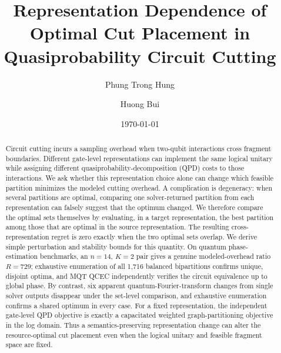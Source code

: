 \documentclass[
  aps,
  pra,
  reprint,
  amsmath,
  amssymb,
  longbibliography,
  nofootinbib,
  floatfix
]{revtex4-2}
\theoremstyle{plain}
\begin{document}
\title{Representation Dependence of Optimal Cut Placement in Quasiprobability Circuit Cutting}

\author{Phung Trong Hung}

\author{Huong Bui}

\date{\today}


\begin{abstract}
Circuit cutting incurs a sampling overhead when two-qubit interactions cross fragment boundaries. Different gate-level representations can implement the same logical unitary while assigning different quasiprobability-decomposition (QPD) costs to those interactions. We ask whether this representation choice alone can change which feasible partition minimizes the modeled cutting overhead. A complication is degeneracy: when several partitions are optimal, comparing one solver-returned partition from each representation can falsely suggest that the optimum changed. We therefore compare the optimal sets themselves by evaluating, in a target representation, the best partition among those that are optimal in the source representation. The resulting cross-representation regret is zero exactly when the two optimal sets overlap. We derive simple perturbation and stability bounds for this quantity. On quantum phase-estimation benchmarks, an $n=14$, $K=2$ pair gives a genuine modeled-overhead ratio $R=729$; exhaustive enumeration of all 1,716 balanced bipartitions confirms unique, disjoint optima, and MQT QCEC independently verifies the circuit equivalence up to global phase. By contrast, six apparent quantum-Fourier-transform changes from single solver outputs disappear under the set-level comparison, and exhaustive enumeration confirms a shared optimum in every case. For a fixed representation, the independent gate-level QPD objective is exactly a capacitated weighted graph-partitioning objective in the log domain. Thus a semantics-preserving representation change can alter the resource-optimal cut placement even when the logical unitary and feasible fragment space are fixed.
\end{abstract}
\end{document}
